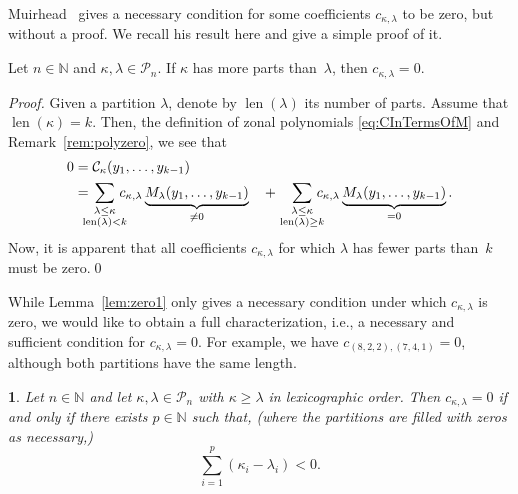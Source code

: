\documentclass[smallextended]{svjour3}
\newtheorem{thm}{\protect\theoremname}
\providecommand{\theoremname}{Theorem}
\begin{document}
Muirhead~\cite[Lem.~7.2.3]{Muirhead} gives a necessary condition for some
coefficients $c_{\kappa,\lambda}$ to be zero, but without a proof. We recall his
result here and give a simple proof of it.
\begin{lemma}\label{lem:zero1}
  Let $n\in\mathbb{N}$ and $\kappa,\lambda\in\mathcal{P}_n$. If $\kappa$
  has more parts than~$\lambda$, then $c_{\kappa,\lambda}=0$.
\end{lemma}
\begin{proof}
  Given a partition $\lambda$, denote by $\operatorname{len}(\lambda)$ its
  number of parts. Assume that $\operatorname{len}(\kappa)=k$. Then, the
  definition of zonal polynomials \eqref{eq:CInTermsOfM} and
  Remark~\ref{rem:polyzero}, we see that
\begin{align*}
 0 &= \mathcal{C}_{\kappa}(y_1,\dots,y_{k-1})\\
    &= 
  \!\!\!\!\!\sum_{\textstyle\genfrac{}{}{0pt}{}{\lambda\leq\kappa}{\operatorname{len}(\lambda)<k}}\!\!\!\!\!
      c_{\kappa,\lambda} \underbrace{M_{\lambda}(y_1,\dots,y_{k-1})}_{\neq0} \quad +
   \sum_{\textstyle\genfrac{}{}{0pt}{}{\lambda\leq\kappa}{\operatorname{len}(\lambda)\geq k}}\!\!\!\!\!
    c_{\kappa,\lambda} \underbrace{M_{\lambda}(y_1,\dots,y_{k-1})}_{=0}.
\end{align*}
  Now, it is apparent that all coefficients $c_{\kappa,\lambda}$
  for which $\lambda$ has fewer parts than~$k$ must be zero.\qed
\end{proof}

While Lemma~\ref{lem:zero1} only gives a necessary condition under which
$c_{\kappa,\lambda}$ is zero, we would like to obtain a full characterization,
i.e., a necessary and sufficient condition for $c_{\kappa,\lambda}=0$. For
example, we have $c_{(8,2,2),(7,4,1)} = 0$, although both partitions have the
same length.
\begin{thm}\label{thm:zero2}
  Let $n\in\mathbb{N}$ and let $\kappa, \lambda\in\mathcal{P}_n$  with $\kappa\geq\lambda$ in lexicographic order. Then $c_{\kappa,\lambda}=0$
  if and only if there exists $p\in\mathbb{N}$ such that,  (where the partitions are filled with zeros as necessary,)
  \begin{equation}\label{eq:prop}
    \sum_{i=1}^p (\kappa_i - \lambda_i) < 0.
  \end{equation}
\end{thm}
\end{document}
